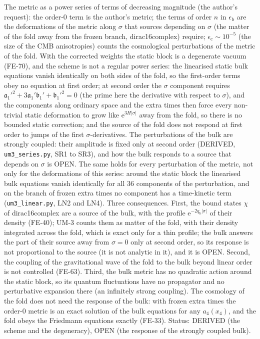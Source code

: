 \documentclass[
  10pt,
]{article}
\begin{document}
The metric as a power series of terms of decreasing magnitude (the
author's request): the order-0 term is the author's metric; the terms of
order \(n\) in \(\epsilon_{\mathrm{b}}\) are the deformations of the
metric along \(\sigma\) that sources depending on \(\sigma\) (the matter
of the fold away from the frozen branch, dirac16complex) require;
\(\epsilon_{\mathrm{c}} \sim 10^{-5}\) (the size of the CMB
anisotropies) counts the cosmological perturbations of the metric of the
fold. With the corrected weights the static block is a degenerate vacuum
(FE-70), and the scheme is not a regular power series: the linearised
static bulk equations vanish identically on both sides of the fold, so
the first-order terms obey no equation at first order; at second order
the \(\sigma\) component requires
\(\mathfrak{a}_1'^2 + 3\mathfrak{a}_1'\mathfrak{b}_1' + \mathfrak{b}_1'^2 = 0\)
(the prime here the derivative with respect to \(\sigma\)), and the
components along ordinary space and the extra times then force every
non-trivial static deformation to grow like
\(\mathrm{e}^{3H\lvert\sigma\rvert}\) away from the fold, so there is no
bounded static correction; and the source of the fold does not respond
at first order to jumps of the first \(\sigma\)-derivatives. The
perturbations of the bulk are strongly coupled: their amplitude is fixed
only at second order (DERIVED, \texttt{um3\_series.py}, SR1 to SR3), and
how the bulk responds to a source that depends on \(\sigma\) is OPEN.
The same holds for every perturbation of the metric, not only for the
deformations of this series: around the static block the linearised bulk
equations vanish identically for all 36 components of the perturbation,
and on the branch of frozen extra times no component has a time-kinetic
term (\texttt{um3\_linear.py}, LN2 and LN4). Three consequences. First,
the bound states \(\chi\) of dirac16complex are a source of the bulk,
with the profile \(\mathrm{e}^{-2q_{\mathrm{b}}\lvert\sigma\rvert}\) of
their density (FE-40); UM-3 counts them as matter of the fold, with
their density integrated across the fold, which is exact only for a thin
profile; the bulk answers the part of their source away from
\(\sigma = 0\) only at second order, so its response is not proportional
to the source (it is not analytic in it), and it is OPEN. Second, the
coupling of the gravitational wave of the fold to the bulk beyond linear
order is not controlled (FE-63). Third, the bulk metric has no quadratic
action around the static block, so its quantum fluctuations have no
propagator and no perturbative expansion there (an infinitely strong
coupling). The cosmology of the fold does not need the response of the
bulk: with frozen extra times the order-0 metric is an exact solution of
the bulk equations for any \(a_4(x_4)\), and the fold obeys the
Friedmann equations exactly (FE-33). Status: DERIVED (the scheme and the
degeneracy), OPEN (the response of the strongly coupled bulk).
\end{document}
